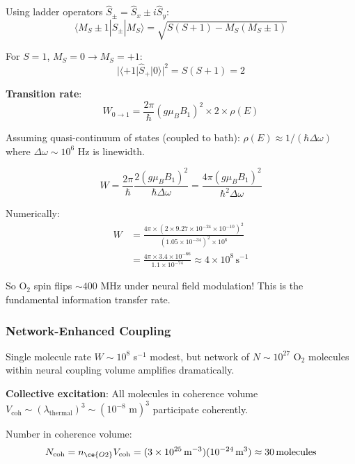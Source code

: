 \documentclass[11pt,onecolumn]{article}
\begin{document}
Using ladder operators $\hat{S}_\pm = \hat{S}_x \pm i\hat{S}_y$:
\begin{equation}
\langle M_S \pm 1 | \hat{S}_\pm | M_S \rangle = \sqrt{S(S+1) - M_S(M_S \pm 1)}
\end{equation}

For $S=1$, $M_S = 0 \to M_S = +1$:
\begin{equation}
|\langle +1 | \hat{S}_+ | 0 \rangle|^2 = S(S+1) = 2
\end{equation}

\textbf{Transition rate}:
\begin{equation}
W_{0 \to 1} = \frac{2\pi}{\hbar}(g\mu_B B_1)^2 \times 2 \times \rho(E)
\end{equation}

Assuming quasi-continuum of states (coupled to bath): $\rho(E) \approx 1/(\hbar\Delta\omega)$ where $\Delta\omega \sim 10^6$ Hz is linewidth.

\begin{equation}
W = \frac{2\pi}{\hbar}\frac{2(g\mu_B B_1)^2}{\hbar\Delta\omega} = \frac{4\pi(g\mu_B B_1)^2}{\hbar^2 \Delta\omega}
\end{equation}

Numerically:
\begin{align}
W &= \frac{4\pi \times (2 \times 9.27 \times 10^{-24} \times 10^{-10})^2}{(1.05 \times 10^{-34})^2 \times 10^6} \\
&= \frac{4\pi \times 3.4 \times 10^{-66}}{1.1 \times 10^{-74}} \approx 4 \times 10^8\,\text{s}^{-1}
\end{align}

So O$_2$ spin flips $\sim 400$ MHz under neural field modulation! This is the fundamental information transfer rate.

\subsubsection{Network-Enhanced Coupling}

Single molecule rate $W \sim 10^8$ s$^{-1}$ modest, but network of $N \sim 10^{27}$ O$_2$ molecules within neural coupling volume amplifies dramatically.

\textbf{Collective excitation}: All molecules in coherence volume $V_{\text{coh}} \sim (\lambda_{\text{thermal}})^3 \sim (10^{-8}\text{ m})^3$ participate coherently.

Number in coherence volume:
\begin{equation}
N_{\text{coh}} = n_{\ce{O2}} V_{\text{coh}} = (3 \times 10^{25}\,\text{m}^{-3})(10^{-24}\,\text{m}^3) \approx 30\,\text{molecules}
\end{equation}
\end{document}
